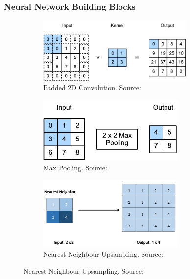 \documentclass{beamer}
\begin{document}
\begin{frame}
    \frametitle{Neural Network Building Blocks}

    \begin{figure}[h]
        \begin{subfigure}[t]{0.5\textwidth}
            \centering
            \includegraphics[width=0.85\textwidth]{conv2d.pdf}
            \caption{Padded 2D Convolution. Source: \cite{zhang2021dive}}
        \end{subfigure}
        \begin{subfigure}[t]{0.49\textwidth}
            \centering
            \includegraphics[width=0.8\textwidth]{pooling.pdf}
            \caption{Max Pooling. Source: \cite{zhang2021dive}}
        \end{subfigure}
        \begin{subfigure}{0.5\textwidth}
            \centering
            \includegraphics[width=0.8\textwidth]{upsampling.png}
            \caption{Nearest Neighbour Upsampling. Source: \cite{phdthesis}}
        \end{subfigure}

\end{figure}
\end{frame}
\end{document}
